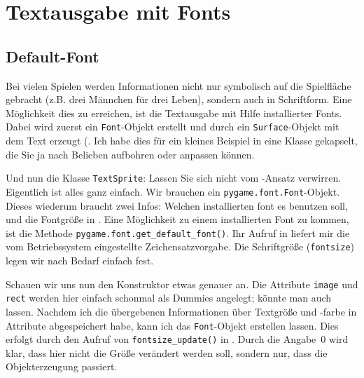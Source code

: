 \newpage
\section{Textausgabe mit Fonts}
\subsection{Default-Font}

Bei vielen Spielen werden Informationen nicht nur symbolisch auf die Spielfläche gebracht (z.B. drei Männchen für drei Leben), sondern auch in Schriftform. Eine Möglichkeit dies zu erreichen, ist die Textausgabe mit Hilfe installierter Fonts. Dabei wird zuerst ein \texttt{Font}-Objekt erstellt und durch ein \texttt{Surface}-Objekt mit dem Text erzeugt (. Ich habe dies für ein kleines Beispiel in eine Klasse gekapselt, die Sie ja nach Belieben aufbohren oder anpassen können.



Und nun die Klasse \texttt{TextSprite}: Lassen Sie sich nicht vom -Ansatz verwirren. Eigentlich ist alles ganz einfach. Wir brauchen ein \texttt{pygame.font.\-Font}-Objekt. Dieses wiederum braucht zwei Infos: Welchen installierten \Gls{font} es benutzen soll, und die Fontgröße in . Eine Möglichkeit zu einem installierten Font zu kommen, ist die Methode \texttt{pygame.font.get\_default\_font()}. Ihr Aufruf in  liefert mir die vom Betriebssystem eingestellte Zeichensatzvorgabe. Die Schriftgröße (\texttt{fontsize}) legen wir nach Bedarf einfach fest. 


Schauen wir uns nun den Konstruktor etwas genauer an. Die  Attribute \texttt{image} und \texttt{rect} werden hier einfach schonmal als Dummies angelegt; könnte man auch lassen. Nachdem ich die übergebenen Informationen über Textgröße und -farbe in Attribute abgespeichert habe, kann ich das \texttt{Font}-Objekt erstellen lassen. Dies erfolgt durch den Aufruf von \texttt{fontsize\_update()} in . Durch die Angabe~0 wird klar, dass hier nicht die Größe verändert werden soll, sondern nur, dass die Objekterzeugung passiert. 

